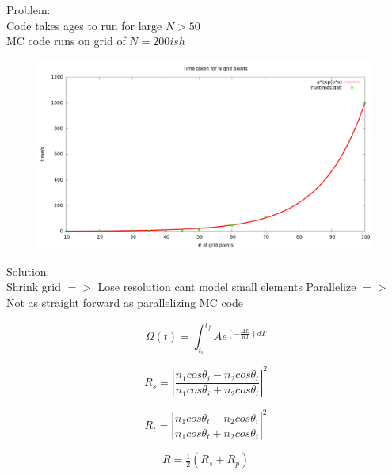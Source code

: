 \documentclass{beamer}
\begin{document}
\begin{frame}
Problem:\\
Code takes ages to run for large $N>50$ \\
MC code runs on grid of $N=200ish$
\begin{figure}
\centering
\includegraphics[scale=.17]{time.png}

\end{figure}
\end{frame}

\begin{frame}
Solution:\\
Shrink grid $=>$ Lose resolution cant model small elements
Parallelize $=>$ Not as straight forward as parallelizing MC code


\begin{equation}
\Omega(t) = \int_{t_0}^{t_f} A e^{(- \tfrac{\Delta E}{RT}) dT}
\end{equation}

\hskip 1cm
\end{frame}


\begin{frame}
\begin{equation}
R_s = \left\lvert \frac{n_1 cos \theta_i - n_2 cos\theta_t}{n_1 cos \theta_i + n_2 cos\theta_t} \right\rvert^2
\end{equation}

\begin{equation}
R_t = \left\lvert \frac{n_1 cos \theta_t - n_2 cos\theta_i}{n_1 cos \theta_t + n_2 cos\theta_i} \right\rvert^2
\end{equation}

\begin{equation}
R = \tfrac{1}{2} (R_s + R_p)
\end{equation}
\end{frame}
\end{document}
